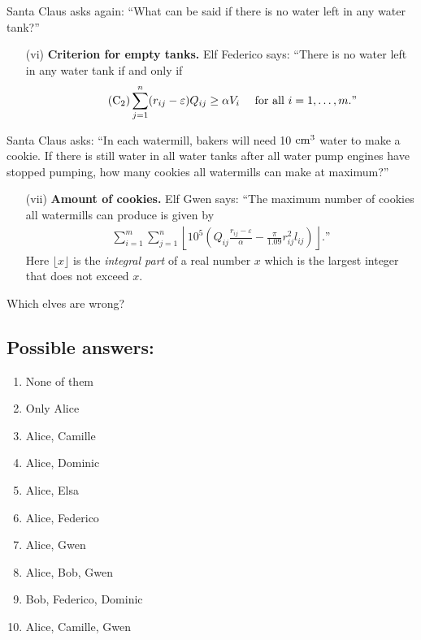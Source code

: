 \documentclass[12pt]{article}
\begin{document}
Santa Claus asks again: ``What can be said if there is no water left in any water tank?''
\begin{itemize}
    \item[(vi)] \textbf{Criterion for empty tanks.} Elf Federico says: ``There is no water left in any water tank if and only if
    \begin{align}
    \label{2}
    \tag{${\rm C}_2$}
    \sum_{j=1}^n (r_{ij} - \varepsilon)Q_{ij}\ge\alpha V_i\quad \mbox{ for all } i = 1,\ldots,m.\mbox{''}
    \end{align}    
\end{itemize}
Santa Claus asks: ``In each watermill, bakers will need 10 ${\rm cm}^3$ water to make a cookie. If there is still water in all water tanks after all water pump engines have stopped pumping, how many cookies all watermills can make at maximum?''
\begin{itemize}
    \item[(vii)] \textbf{Amount of cookies.} Elf Gwen says: ``The maximum number of cookies all watermills can produce is given by
    \begin{align*}
    \sum_{i=1}^m\sum_{j=1}^n\left\lfloor 10^5 \left(Q_{ij}\frac{r_{ij} - \varepsilon}{\alpha} - \frac{\pi}{1.09}r_{ij}^2l_{ij}\right)\right\rfloor.\mbox{''}
    \end{align*}
    Here $\lfloor x\rfloor$ is the \textit{integral part} of a real number $x$ which is the largest integer that does not exceed $x$.
\end{itemize}

Which elves are wrong?

\subsection*{Possible answers:}


\begin{enumerate}
    \item None of them
    \item Only Alice
    \item Alice, Camille
    \item Alice, Dominic
    \item Alice, Elsa
    \item Alice, Federico
    \item Alice, Gwen
    \item Alice, Bob, Gwen
    \item Bob, Federico, Dominic
    \item Alice, Camille, Gwen
\end{enumerate}
\end{document}
